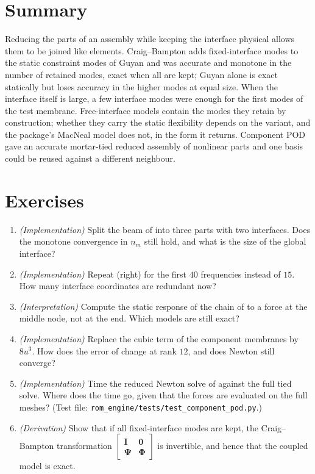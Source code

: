 \section{Summary}\label{sec:cm-summary}

Reducing the parts of an assembly while keeping the interface physical allows them to be joined like elements. Craig--Bampton adds fixed-interface modes to the static constraint modes of Guyan and was accurate and monotone in the number of retained modes, exact when all are kept; Guyan alone is exact statically but loses accuracy in the higher modes at equal size. When the interface itself is large, a few interface modes were enough for the first modes of the test membrane. Free-interface models contain the modes they retain by construction; whether they carry the static flexibility depends on the variant, and the package's MacNeal model does not, in the form it returns. Component POD gave an accurate mortar-tied reduced assembly of nonlinear parts and one basis could be reused against a different neighbour.

\section*{Exercises}\label{sec:cm-exercises}
\begin{enumerate}
\item \emph{(Implementation)} Split the beam of  into three parts with two interfaces. Does the monotone convergence in $n_m$ still hold, and what is the size of the global interface?
\item \emph{(Implementation)} Repeat  (right) for the first $40$ frequencies instead of $15$. How many interface coordinates are redundant now?
\item \emph{(Interpretation)} Compute the static response of the chain of  to a force at the middle node, not at the end. Which models are still exact?
\item \emph{(Implementation)} Replace the cubic term of the component membranes by $8u^3$. How does the error of  change at rank $12$, and does Newton still converge?
\item \emph{(Implementation)} Time the reduced Newton solve of  against the full tied solve. Where does the time go, given that the forces are evaluated on the full meshes? (Test file: \texttt{rom\_engine/tests/test\_component\_pod.py}.)
\item \emph{(Derivation)} Show that if all fixed-interface modes are kept, the Craig--Bampton transformation $\left[\begin{smallmatrix}\bm I&\bm 0\\\bm\Psi&\bm\Phi\end{smallmatrix}\right]$ is invertible, and hence that the coupled model is exact.
\end{enumerate}

\chapterrefs
